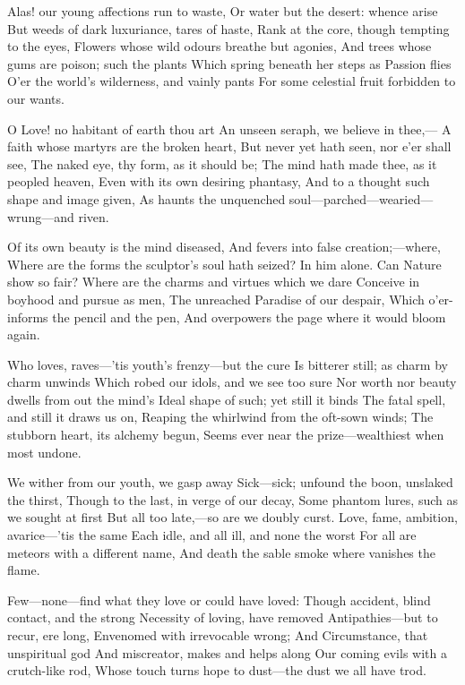 \documentclass[10pt,twocolumn]{book}
\begin{document}
   Alas! our young affections run to waste,
   Or water but the desert:  whence arise
   But weeds of dark luxuriance, tares of haste,
   Rank at the core, though tempting to the eyes,
   Flowers whose wild odours breathe but agonies,
   And trees whose gums are poison; such the plants
   Which spring beneath her steps as Passion flies
   O'er the world's wilderness, and vainly pants
For some celestial fruit forbidden to our wants.


   O Love! no habitant of earth thou art\textemdash
   An unseen seraph, we believe in thee,---
   A faith whose martyrs are the broken heart,
   But never yet hath seen, nor e'er shall see,
   The naked eye, thy form, as it should be;
   The mind hath made thee, as it peopled heaven,
   Even with its own desiring phantasy,
   And to a thought such shape and image given,
As haunts the unquenched soul---parched---wearied---wrung---and riven.


   Of its own beauty is the mind diseased,
   And fevers into false creation;---where,
   Where are the forms the sculptor's soul hath seized?
   In him alone.  Can Nature show so fair?
   Where are the charms and virtues which we dare
   Conceive in boyhood and pursue as men,
   The unreached Paradise of our despair,
   Which o'er-informs the pencil and the pen,
And overpowers the page where it would bloom again.


   Who loves, raves---'tis youth's frenzy---but the cure
   Is bitterer still; as charm by charm unwinds
   Which robed our idols, and we see too sure
   Nor worth nor beauty dwells from out the mind's
   Ideal shape of such; yet still it binds
   The fatal spell, and still it draws us on,
   Reaping the whirlwind from the oft-sown winds;
   The stubborn heart, its alchemy begun,
Seems ever near the prize---wealthiest when most undone.


   We wither from our youth, we gasp away\textemdash
   Sick---sick; unfound the boon, unslaked the thirst,
   Though to the last, in verge of our decay,
   Some phantom lures, such as we sought at first\textemdash
   But all too late,---so are we doubly curst.
   Love, fame, ambition, avarice---'tis the same\textemdash
   Each idle, and all ill, and none the worst\textemdash
   For all are meteors with a different name,
And death the sable smoke where vanishes the flame.


   Few---none---find what they love or could have loved:
   Though accident, blind contact, and the strong
   Necessity of loving, have removed
   Antipathies---but to recur, ere long,
   Envenomed with irrevocable wrong;
   And Circumstance, that unspiritual god
   And miscreator, makes and helps along
   Our coming evils with a crutch-like rod,
Whose touch turns hope to dust---the dust we all have trod.
\end{document}
